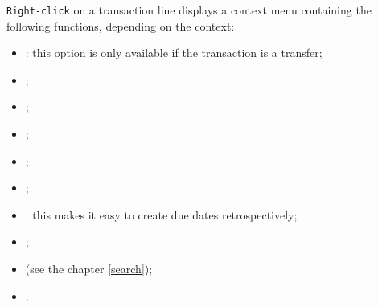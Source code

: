 \texttt{Right-click} on a transaction line displays a context menu containing the following functions, depending on the context:

\vspace{3mm}
\noindent
\begin{minipage}{.65\linewidth}
\begin{itemize}[rightmargin=.6cm]
	\item {}: this option is only available if the transaction is a transfer;
	\item {};
	\item {};
	\item {};
	\item {};
	\item {};
	\item {}: this makes it easy to create due dates retrospectively;
	\item {};
	\item {} (see the chapter \vref{search});
	\item {}.
\end{itemize}
\end{minipage}
